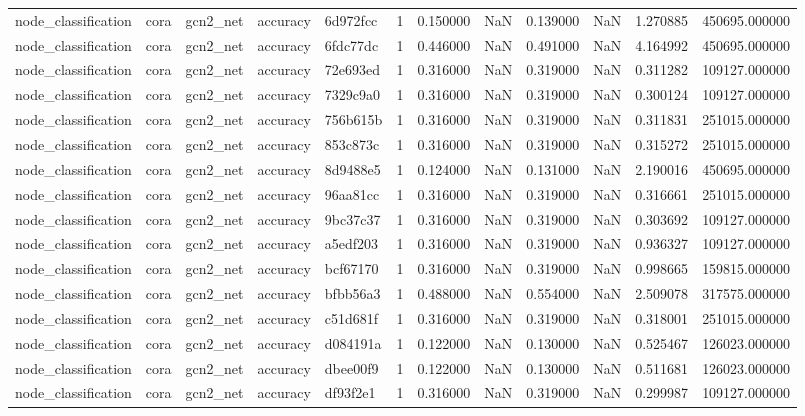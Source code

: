 \begin{tabular}{lllllrrrrrrr}
node_classification & cora & gcn2_net & accuracy & 6d972fcc & 1 & 0.150000 & NaN & 0.139000 & NaN & 1.270885 & 450695.000000 \\
node_classification & cora & gcn2_net & accuracy & 6fdc77dc & 1 & 0.446000 & NaN & 0.491000 & NaN & 4.164992 & 450695.000000 \\
node_classification & cora & gcn2_net & accuracy & 72e693ed & 1 & 0.316000 & NaN & 0.319000 & NaN & 0.311282 & 109127.000000 \\
node_classification & cora & gcn2_net & accuracy & 7329c9a0 & 1 & 0.316000 & NaN & 0.319000 & NaN & 0.300124 & 109127.000000 \\
node_classification & cora & gcn2_net & accuracy & 756b615b & 1 & 0.316000 & NaN & 0.319000 & NaN & 0.311831 & 251015.000000 \\
node_classification & cora & gcn2_net & accuracy & 853c873c & 1 & 0.316000 & NaN & 0.319000 & NaN & 0.315272 & 251015.000000 \\
node_classification & cora & gcn2_net & accuracy & 8d9488e5 & 1 & 0.124000 & NaN & 0.131000 & NaN & 2.190016 & 450695.000000 \\
node_classification & cora & gcn2_net & accuracy & 96aa81cc & 1 & 0.316000 & NaN & 0.319000 & NaN & 0.316661 & 251015.000000 \\
node_classification & cora & gcn2_net & accuracy & 9bc37c37 & 1 & 0.316000 & NaN & 0.319000 & NaN & 0.303692 & 109127.000000 \\
node_classification & cora & gcn2_net & accuracy & a5edf203 & 1 & 0.316000 & NaN & 0.319000 & NaN & 0.936327 & 109127.000000 \\
node_classification & cora & gcn2_net & accuracy & bcf67170 & 1 & 0.316000 & NaN & 0.319000 & NaN & 0.998665 & 159815.000000 \\
node_classification & cora & gcn2_net & accuracy & bfbb56a3 & 1 & 0.488000 & NaN & 0.554000 & NaN & 2.509078 & 317575.000000 \\
node_classification & cora & gcn2_net & accuracy & c51d681f & 1 & 0.316000 & NaN & 0.319000 & NaN & 0.318001 & 251015.000000 \\
node_classification & cora & gcn2_net & accuracy & d084191a & 1 & 0.122000 & NaN & 0.130000 & NaN & 0.525467 & 126023.000000 \\
node_classification & cora & gcn2_net & accuracy & dbee00f9 & 1 & 0.122000 & NaN & 0.130000 & NaN & 0.511681 & 126023.000000 \\
node_classification & cora & gcn2_net & accuracy & df93f2e1 & 1 & 0.316000 & NaN & 0.319000 & NaN & 0.299987 & 109127.000000 \\

\end{tabular}

